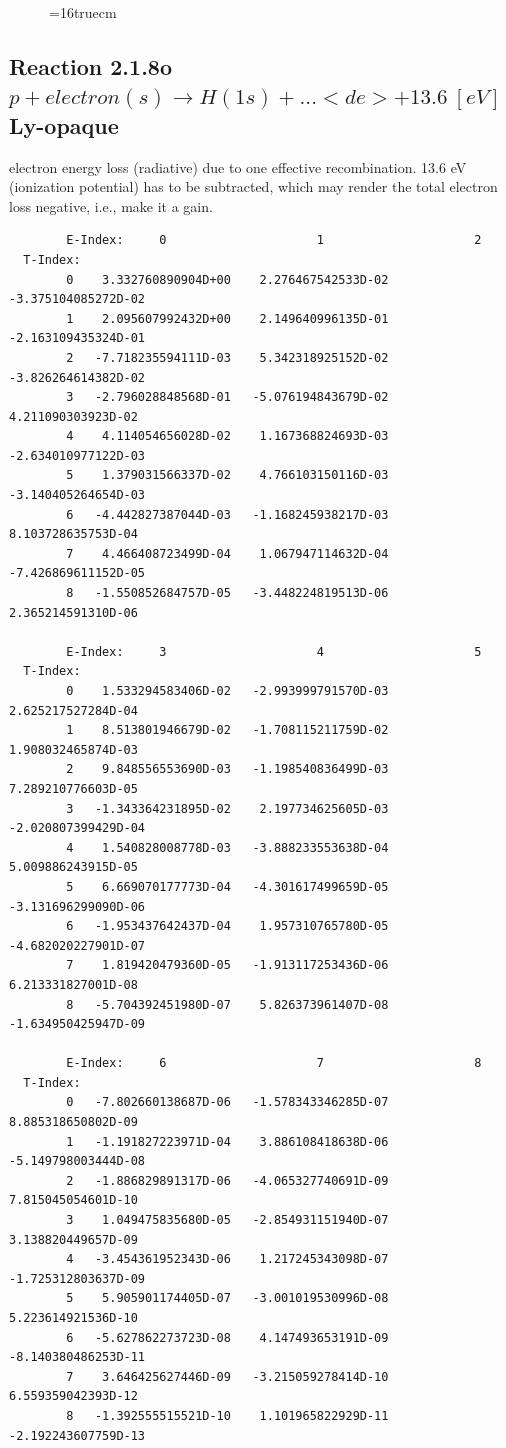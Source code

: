 \documentclass[12pt,dvips]{article}
\begin{document}
\begin{figure} \label{2.1.8lr3}
\epsfxsize=16truecm
\end{figure}
\newpage



\subsection{
  Reaction 2.1.8o $p + electron(s) \rightarrow H(1s) + ... <de>+13.6 \ [eV] $
  Ly-opaque
}

  electron energy loss (radiative) due to one effective recombination.
  13.6 eV (ionization potential) has to be
  subtracted, which may render the total electron loss negative, i.e., make it a gain.

\begin{small}\begin{verbatim}
        E-Index:     0                     1                     2
  T-Index:
        0    3.332760890904D+00    2.276467542533D-02   -3.375104085272D-02
        1    2.095607992432D+00    2.149640996135D-01   -2.163109435324D-01
        2   -7.718235594111D-03    5.342318925152D-02   -3.826264614382D-02
        3   -2.796028848568D-01   -5.076194843679D-02    4.211090303923D-02
        4    4.114054656028D-02    1.167368824693D-03   -2.634010977122D-03
        5    1.379031566337D-02    4.766103150116D-03   -3.140405264654D-03
        6   -4.442827387044D-03   -1.168245938217D-03    8.103728635753D-04
        7    4.466408723499D-04    1.067947114632D-04   -7.426869611152D-05
        8   -1.550852684757D-05   -3.448224819513D-06    2.365214591310D-06

        E-Index:     3                     4                     5
  T-Index:
        0    1.533294583406D-02   -2.993999791570D-03    2.625217527284D-04
        1    8.513801946679D-02   -1.708115211759D-02    1.908032465874D-03
        2    9.848556553690D-03   -1.198540836499D-03    7.289210776603D-05
        3   -1.343364231895D-02    2.197734625605D-03   -2.020807399429D-04
        4    1.540828008778D-03   -3.888233553638D-04    5.009886243915D-05
        5    6.669070177773D-04   -4.301617499659D-05   -3.131696299090D-06
        6   -1.953437642437D-04    1.957310765780D-05   -4.682020227901D-07
        7    1.819420479360D-05   -1.913117253436D-06    6.213331827001D-08
        8   -5.704392451980D-07    5.826373961407D-08   -1.634950425947D-09

        E-Index:     6                     7                     8
  T-Index:
        0   -7.802660138687D-06   -1.578343346285D-07    8.885318650802D-09
        1   -1.191827223971D-04    3.886108418638D-06   -5.149798003444D-08
        2   -1.886829891317D-06   -4.065327740691D-09    7.815045054601D-10
        3    1.049475835680D-05   -2.854931151940D-07    3.138820449657D-09
        4   -3.454361952343D-06    1.217245343098D-07   -1.725312803637D-09
        5    5.905901174405D-07   -3.001019530996D-08    5.223614921536D-10
        6   -5.627862273723D-08    4.147493653191D-09   -8.140380486253D-11
        7    3.646425627446D-09   -3.215059278414D-10    6.559359042393D-12
        8   -1.392555515521D-10    1.101965822929D-11   -2.192243607759D-13


\end{verbatim}
\end{small}
\end{document}
